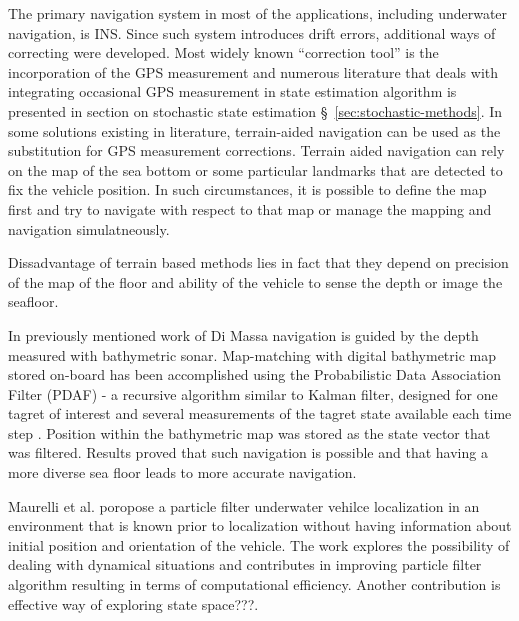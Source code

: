 The primary navigation system in most of the applications, including underwater navigation, is INS. Since such system introduces drift errors, additional ways of correcting were developed. Most widely known ``correction tool'' is the incorporation of the GPS measurement and numerous literature that deals with integrating occasional GPS measurement in state estimation algorithm is presented in section on stochastic state estimation \S~\ref{sec:stochastic-methods}. In some solutions existing in literature, terrain-aided navigation can be used as the substitution for GPS measurement corrections. Terrain aided navigation can rely on the map of the sea bottom or some particular landmarks that are detected to fix the vehicle position. In such circumstances, it is possible to define the map first and try to navigate with respect to that map or manage the mapping and navigation simulatneously.

Dissadvantage of terrain based methods lies in fact that they depend on precision of the map of the floor and ability of the vehicle to sense the depth or image the seafloor.  

In previously mentioned work of Di Massa \cite{diMassa97} navigation is guided by the depth measured with bathymetric sonar. Map-matching with digital bathymetric map stored on-board has been accomplished using the Probabilistic Data Association Filter (PDAF) - a recursive algorithm similar to Kalman filter, designed for one tagret of interest and several measurements of the tagret state available each time step \cite{diMassa97}. Position within the bathymetric map was stored as the state vector that was filtered. Results proved that such navigation is possible and that having a more diverse sea floor leads to more accurate navigation.

Maurelli et al. \cite{maurelli08} poropose a particle filter underwater vehilce localization in an environment that is known prior to localization without having information about initial position and orientation of the vehicle. The work explores the possibility of dealing with dynamical situations and contributes in improving particle filter algorithm resulting in terms of computational efficiency. Another contribution is effective way of exploring state space???.





